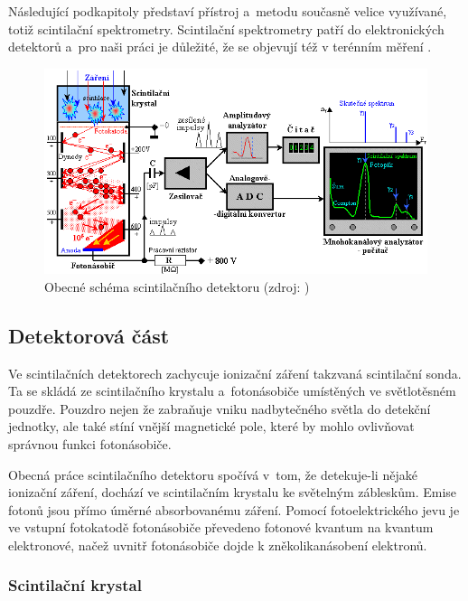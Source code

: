 Následující podkapitoly představí přístroj a~metodu současně velice využívané,
totiž scintilační spektrometry. Scintilační spektrometry patří do elektronických detektorů
a~pro naši práci je důležité, že se objevují též v terénním měření . 

  \begin{figure}[H]
   \centering
	\includegraphics[scale=0.75]{./pictures/scintilacni-detektor.png}
	\caption[Obecné schéma scintilačního detektoru]{Obecné schéma scintilačního detektoru
	(zdroj: \cite{spektrometrie})}
      \label{fig:scintilacni-detektor}
  \end{figure}

\subsection{Detektorová část}
\label{detektor}

Ve scintilačních detektorech zachycuje ionizační záření takzvaná scintilační sonda.
Ta se skládá ze scintilačního krystalu a~fotonásobiče umístěných ve světlotěsném pou\-zdře.
Pouzdro nejen že zabraňuje vniku nadbytečného světla do detekční jednotky, ale také stíní
vnější magnetické pole, které by mohlo ovlivňovat správnou funkci fotonásobiče. 

Obecná práce scintilačního detektoru spočívá v~tom, že detekuje-li nějaké ionizační záření, dochází ve
scintilačním krystalu ke světelným zábleskům. Emise fotonů jsou přímo úměrné absorbovanému záření.
Pomocí fotoelektrického jevu je ve vstup\-ní fotokatodě fotonásobiče převedeno fotonové kvantum na kvantum
elektronové, načež uvnitř fotonásobiče dojde k zněkolikanásobení elektronů. 

\subsubsection{Scintilační krystal}
\label{krystal}

